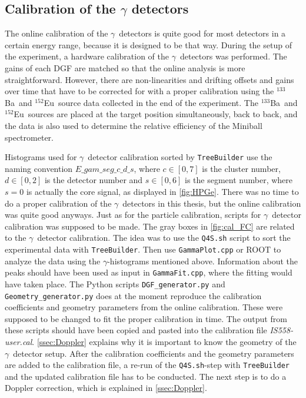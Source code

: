 \documentclass[twoside,english]{uiofysmaster/uiofysmaster}
\newcommand{\ga}{$\gamma$}
\newcommand{\Ba}{$^{133}$Ba}
\newcommand{\Eu}{$^{152}$Eu}
\let\orgautoref\autoref
\renewcommand{\autoref}
        {%
		 \def\sectionautorefname{Section}%
		 \def\subsectionautorefname{Section}%
		 \def\subsubsectionautorefname{Section}%
		 \def\chapterautorefname{Chapter}%
          \orgautoref}
\begin{document}
\subsection{Calibration of the \texorpdfstring{$\gamma$}{gamma} detectors}\label{ssec:gamma}
The online calibration of the \ga\ detectors is quite good for most detectors in a certain energy range, because it is designed to be that way. 
During the setup of the experiment, a hardware calibration of the \ga\ detectors was performed. 
The gains of each DGF are matched so that the online analysis is more straightforward.
However, there are non-linearities and drifting offsets and gains over time that have to be corrected for with a proper calibration using the \Ba\ and \Eu\ source data collected in the end of the experiment. The \Ba\ and \Eu\ sources are placed at the target position simultaneously, back to back, and the data is also used to determine the relative efficiency of the Miniball spectrometer. 

Histograms used for \ga\ detector calibration sorted by \texttt{TreeBuilder} use the naming convention $\textit{E\_gam\_seg}\_c\_d\_s$, where $c \in [0, 7]$ is the cluster number, $d \in [0, 2]$ is the detector number and $s \in [0, 6]$ is the segment number, where $s = 0$ is actually the core signal, as displayed in \autoref{fig:HPGe}.
There was no time to do a proper calibration of the \ga\ detectors in this thesis, but the online calibration was quite good anyways.
Just as for the particle calibration, scripts for \ga\ detector calibration was supposed to be made. 
The gray boxes in \autoref{fig:cal_FC} are related to the \ga\ detector calibration. 
The idea was to use the \texttt{Q4S.sh} script to sort the experimental data with \texttt{TreeBuilder}.
Then use \texttt{GammaPlot.cpp} or ROOT to analyze the data using the \ga-histograms mentioned above. 
Information about the peaks should have been used as input in \texttt{GammaFit.cpp}, where the fitting would have taken place. 
The Python scripts \texttt{DGF\_generator.py} and \texttt{Geometry\_generator.py} does at the moment reproduce the calibration coefficients and geometry parameters from the online calibration. 
These were supposed to be changed to fit the proper calibration in time.  
The output from these scripts should have been copied and pasted into the calibration file \textit{IS558-user.cal}.
\autoref{ssec:Doppler} explains why it is important to know the geometry of the \ga\ detector setup.
After the calibration coefficients and the geometry parameters are added to the calibration file, a re-run of the \texttt{Q4S.sh}-step with \texttt{TreeBuilder} and the updated calibration file has to be conducted. 
The next step is to do a Doppler correction, which is explained in  
\autoref{ssec:Doppler}. 
\end{document}
